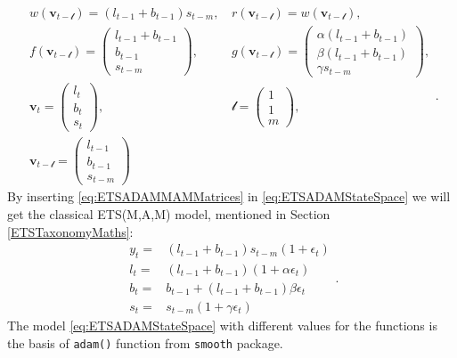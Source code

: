 \documentclass[
]{book}
\theoremstyle{definition}
\theoremstyle{definition}
\theoremstyle{definition}
\theoremstyle{definition}
\theoremstyle{remark}
\begin{document}
\begin{equation}
  \begin{aligned}
    w(\mathbf{v}_{t-\boldsymbol{\mathscr{l}}}) = (l_{t-1}+b_{t-1}) s_{t-m}\text{, } &
    r(\mathbf{v}_{t-\boldsymbol{\mathscr{l}}}) = w(\mathbf{v}_{t-\boldsymbol{\mathscr{l}}}), \\
    f(\mathbf{v}_{t-\boldsymbol{\mathscr{l}}}) = \begin{pmatrix} l_{t-1} + b_{t-1} \\ b_{t-1} \\ s_{t-m} \end{pmatrix}\text{, } &
    g(\mathbf{v}_{t-\boldsymbol{\mathscr{l}}}) = \begin{pmatrix} \alpha (l_{t-1} + b_{t-1}) \\ \beta (l_{t-1} + b_{t-1}) \\ \gamma s_{t-m} \end{pmatrix}, \\
    \mathbf{v}_{t} = \begin{pmatrix} l_t \\ b_t \\ s_t \end{pmatrix}\text{, } &
    \boldsymbol{\mathscr{l}} = \begin{pmatrix} 1 \\ 1 \\ m \end{pmatrix}, \\
    \mathbf{v}_{t-\boldsymbol{\mathscr{l}}} = \begin{pmatrix} l_{t-1} \\ b_{t-1} \\ s_{t-m} \end{pmatrix}
  \end{aligned}.
  \label{eq:ETSADAMMAMMatrices}
\end{equation}
By inserting \eqref{eq:ETSADAMMAMMatrices} in \eqref{eq:ETSADAMStateSpace} we will get the classical ETS(M,A,M) model, mentioned in Section \ref{ETSTaxonomyMaths}:
\begin{equation}
  \begin{aligned}
    y_{t} = & (l_{t-1} + b_{t-1}) s_{t-m}(1 + \epsilon_t) \\
    l_t = & (l_{t-1} + b_{t-1})(1 + \alpha \epsilon_t) \\
    b_t = & b_{t-1} + (l_{t-1} + b_{t-1}) \beta \epsilon_t \\
    s_t = & s_{t-m} (1 + \gamma \epsilon_t) 
  \end{aligned}.
  \label{eq:ETSADAMMAM}
\end{equation}
The model \eqref{eq:ETSADAMStateSpace} with different values for the functions is the basis of \texttt{adam()} function from \texttt{smooth} package.
\end{document}
